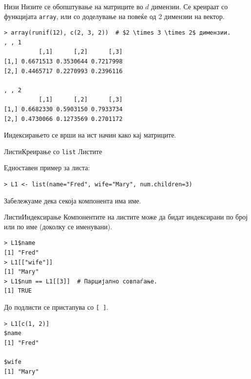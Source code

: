 \documentclass[hyperref={unicode}, xcolor={svgnames, table},
usepdftitle=false]{beamer}
\theoremstyle{remark}
\begin{document}
\begin{frame}[fragile]{Низи}
  Низите се обопштување на матриците во \(d\) димензии.  Се креираат со
  функцијата \texttt{array}, или со доделување на повеќе од \num{2}
  димензии на вектор.
\begin{verbatim}
> array(runif(12), c(2, 3, 2))  # $2 \times 3 \times 2$ димензии.
, , 1
          [,1]      [,2]      [,3]
[1,] 0.6671513 0.3530644 0.7217998
[2,] 0.4465717 0.2270993 0.2396116

, , 2
          [,1]      [,2]      [,3]
[1,] 0.6682330 0.5903150 0.7933734
[2,] 0.4730066 0.1273569 0.2701172
\end{verbatim}

  Индексирањето се врши на ист начин како кај матриците.
\end{frame}

\begin{frame}[fragile]{Листи}{Креирање со \texttt{list}}
  Листите

  Едноставен пример за листа:
\begin{verbatim}
> L1 <- list(name="Fred", wife="Mary", num.children=3)
\end{verbatim}
  Забележуаме дека секоја компонента има име.
\end{frame}

\begin{frame}[fragile]{Листи}{Индексирање}
  Компонентите на листите може да бидат индексирани по број или по име (доколку
  се именувани).
\begin{verbatim}
> L1$name
[1] "Fred"
> L1[["wife"]]
[1] "Mary"
> L1$num == L1[[3]]  # Парцијално совпаѓање.
[1] TRUE
\end{verbatim}

  До подлисти се пристапува со \texttt{[ ]}.
\begin{verbatim}
> L1[c(1, 2)]
$name
[1] "Fred"

$wife
[1] "Mary"
\end{verbatim}
\end{frame}
\end{document}
